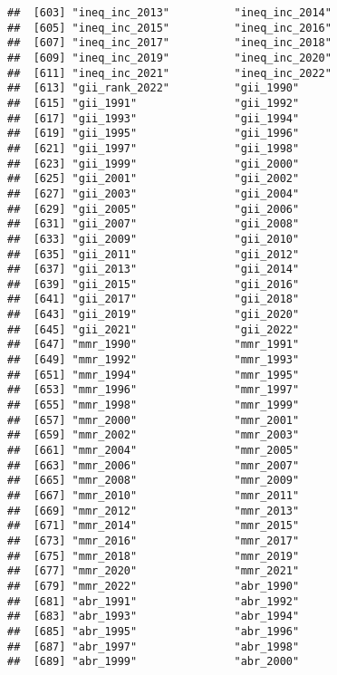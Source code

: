\documentclass[
]{article}
\begin{document}
\begin{verbatim}
##  [603] "ineq_inc_2013"          "ineq_inc_2014"         
##  [605] "ineq_inc_2015"          "ineq_inc_2016"         
##  [607] "ineq_inc_2017"          "ineq_inc_2018"         
##  [609] "ineq_inc_2019"          "ineq_inc_2020"         
##  [611] "ineq_inc_2021"          "ineq_inc_2022"         
##  [613] "gii_rank_2022"          "gii_1990"              
##  [615] "gii_1991"               "gii_1992"              
##  [617] "gii_1993"               "gii_1994"              
##  [619] "gii_1995"               "gii_1996"              
##  [621] "gii_1997"               "gii_1998"              
##  [623] "gii_1999"               "gii_2000"              
##  [625] "gii_2001"               "gii_2002"              
##  [627] "gii_2003"               "gii_2004"              
##  [629] "gii_2005"               "gii_2006"              
##  [631] "gii_2007"               "gii_2008"              
##  [633] "gii_2009"               "gii_2010"              
##  [635] "gii_2011"               "gii_2012"              
##  [637] "gii_2013"               "gii_2014"              
##  [639] "gii_2015"               "gii_2016"              
##  [641] "gii_2017"               "gii_2018"              
##  [643] "gii_2019"               "gii_2020"              
##  [645] "gii_2021"               "gii_2022"              
##  [647] "mmr_1990"               "mmr_1991"              
##  [649] "mmr_1992"               "mmr_1993"              
##  [651] "mmr_1994"               "mmr_1995"              
##  [653] "mmr_1996"               "mmr_1997"              
##  [655] "mmr_1998"               "mmr_1999"              
##  [657] "mmr_2000"               "mmr_2001"              
##  [659] "mmr_2002"               "mmr_2003"              
##  [661] "mmr_2004"               "mmr_2005"              
##  [663] "mmr_2006"               "mmr_2007"              
##  [665] "mmr_2008"               "mmr_2009"              
##  [667] "mmr_2010"               "mmr_2011"              
##  [669] "mmr_2012"               "mmr_2013"              
##  [671] "mmr_2014"               "mmr_2015"              
##  [673] "mmr_2016"               "mmr_2017"              
##  [675] "mmr_2018"               "mmr_2019"              
##  [677] "mmr_2020"               "mmr_2021"              
##  [679] "mmr_2022"               "abr_1990"              
##  [681] "abr_1991"               "abr_1992"              
##  [683] "abr_1993"               "abr_1994"              
##  [685] "abr_1995"               "abr_1996"              
##  [687] "abr_1997"               "abr_1998"              
##  [689] "abr_1999"               "abr_2000"              

\end{verbatim}
\end{document}
